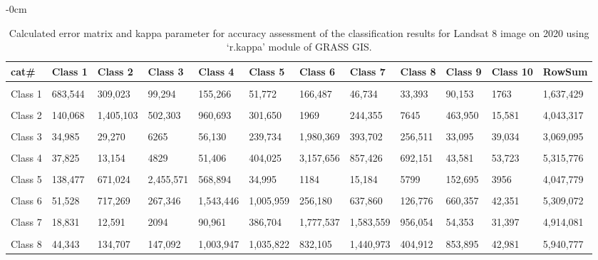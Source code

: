 \documentclass[analytics,article,accept,pdftex,moreauthors]{Definitions/mdpi}
\begin{document}
\begin{table}[H] 
    \caption{Calculated error matrix and kappa parameter for accuracy assessment of the classification results for Landsat 8 image on 2020 using `r.kappa' module of GRASS GIS.}%
    \begin{adjustwidth}{-\extralength}{0cm}
 	\begin{tabularx}{\fulllength}{lllllllllllL}
    \toprule
        \textbf{cat\#} & \textbf{Class 1} & \textbf{Class 2} & \textbf{Class 3} & \textbf{Class 4} & \textbf{Class 5} & \textbf{Class 6} & \textbf{Class 7} & \textbf{Class 8} & \textbf{Class 9} & \textbf{Class 10} & \textbf{RowSum} \\ \hline
      &&&&&&&&&&&\\[-2ex]
        Class 1 & 683,544 & 309,023 & 99,294 & 155,266 & 51,772 & 166,487 & 46,734 & 33,393 & 90,153 & 1763 & 1,637,429 \\ \hline
      &&&&&&&&&&&\\[-2ex]
        Class 2 & 140,068 & 1,405,103 & 502,303 & 960,693 & 301,650 & 1969 & 244,355 & 7645 & 463,950 & 15,581 & 4,043,317 \\ \hline
      &&&&&&&&&&&\\[-2ex]
        Class 3 & 34,985 & 29,270 & 6265 & 56,130 & 239,734 & 1,980,369 & 393,702 & 256,511 & 33,095 & 39,034 & 3,069,095 \\ \hline
      &&&&&&&&&&&\\[-2ex]
        Class 4 & 37,825 & 13,154 & 4829 & 51,406 & 404,025 & 3,157,656 & 857,426 & 692,151 & 43,581 & 53,723 & 5,315,776 \\ \hline
      &&&&&&&&&&&\\[-2ex]
        Class 5 & 138,477 & 671,024 & 2,455,571 & 568,894 & 34,995 & 1184 & 15,184 & 5799 & 152,695 & 3956 & 4,047,779 \\ \hline
      &&&&&&&&&&&\\[-2ex]
        Class 6 & 51,528 & 717,269 & 267,346 & 1,543,446 & 1,005,959 & 256,180 & 637,860 & 126,776 & 660,357 & 42,351 & 5,309,072 \\ \hline
      &&&&&&&&&&&\\[-2ex]
        Class 7 & 18,831 & 12,591 & 2094 & 90,961 & 386,704 & 1,777,537 & 1,583,559 & 956,054 & 54,353 & 31,397 & 4,914,081 \\ \hline
      &&&&&&&&&&&\\[-2ex]
        Class 8 & 44,343 & 134,707 & 147,092 & 1,003,947 & 1,035,822 & 832,105 & 1,440,973 & 404,912 & 853,895 & 42,981 & 5,940,777 \\ \hline

\end{tabularx}
\end{adjustwidth}
\end{table}
\end{document}

